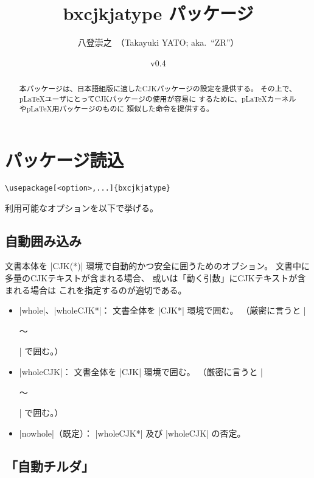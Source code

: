 \documentclass[a4paper]{ltjsarticle}
\newcommand{\PkgVersion}{0.4}
\newcommand{\PkgDate}{2016/11/11}
\newcommand{\Pkg}[1]{\textsf{#1}}
\newcommand{\Means}{：\quad}
\providecommand{\pLaTeX}{p\LaTeX}
\begin{document}
\title{\Pkg{bxcjkjatype} パッケージ}
\author{八登崇之\ （Takayuki YATO; aka.~``ZR''）}
\date{v\PkgVersion\quad[\PkgDate]}
\maketitle

\begin{abstract}
本パッケージは、日本語組版に適した\Pkg{CJK}パッケージの設定を提供する。
その上で、{\pLaTeX}ユーザにとって\Pkg{CJK}パッケージの使用が容易に
するために、{\pLaTeX}カーネルや{\pLaTeX}用パッケージのものに
類似した命令を提供する。
\end{abstract}

\tableofcontents

\section{パッケージ読込}
\label{sec:loading}

\begin{verbatim}
\usepackage[<option>,...]{bxcjkjatype}
\end{verbatim}

利用可能なオプションを以下で挙げる。

\subsection{自動囲み込み}

文書本体を |CJK(*)| 環境で自動的かつ安全に囲うためのオプション。
文書中に多量のCJKテキストが含まれる場合、
或いは「動く引数」にCJKテキストが含まれる場合は
これを指定するのが適切である。

\begin{itemize}
\item |whole|、|wholeCJK*|\Means
  文書全体を |CJK*| 環境で囲む。
  （厳密に言うと |\begin{uCJK*}～\end{uCJK*}| で囲む。）
\item |wholeCJK|\Means
  文書全体を |CJK| 環境で囲む。
  （厳密に言うと |\begin{uCJK}～\end{uCJK}| で囲む。）
\item |nowhole|（既定）\Means
  |wholeCJK*| 及び |wholeCJK| の否定。
\end{itemize}

\subsection{「自動チルダ」}
\end{document}
